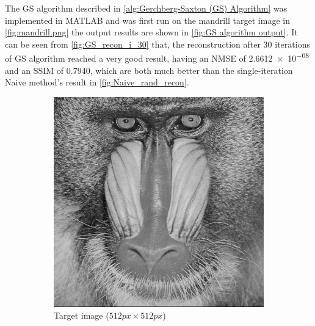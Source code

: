 The GS algorithm described in \cref{alg:Gerchberg-Saxton (GS) Algorithm} was implemented in MATLAB and was first run on the mandrill target image in \cref{fig:mandrill.png} the output results are shown in \cref{fig:GS algorithm output}. It can be seen from \cref{fig:GS_recon_i_30} that, the reconstruction after 30 iterations of GS algorithm reached a very good result, having an NMSE of \num{2.6612e-08} and an SSIM of 0.7940, which are both much better than the single-iteration Naive method's result in \cref{fig:Naive_rand_recon}.

\begin{figure}[H]
  \centering
  \begin{subfigure}[t]{0.3\textwidth}
    \centering
    \includegraphics[width=\textwidth]{mandrill.png}
    \caption{Target image ($512 px\times 512 px$)}
  \end{subfigure}
  \hfill
  \begin{subfigure}[t]{0.3\textwidth}
    \centering

\end{subfigure}
\end{figure}
